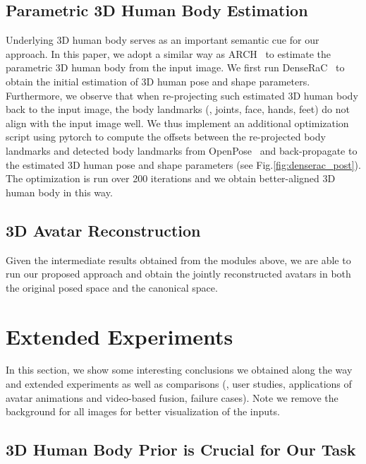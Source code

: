 \documentclass[10pt,twocolumn,letterpaper]{article}
\begin{document}
\subsection{Parametric 3D Human Body Estimation}



Underlying 3D human body serves as an important semantic cue for our approach. In this paper, we adopt a similar way as ARCH~\cite{huang2020arch} to estimate the parametric 3D human body from the input image. We first run DenseRaC~\cite{DenseRaCICCV19} to obtain the initial estimation of 3D human pose and shape parameters. Furthermore, we observe that when re-projecting such estimated 3D human body back to the input image, the body landmarks (\eg, joints, face, hands, feet) do not align with the input image well. We thus implement an additional optimization script using pytorch to compute the offsets between the re-projected body landmarks and detected body landmarks from OpenPose~\cite{openpose} and back-propagate to the estimated 3D human pose and shape parameters (see Fig.\ref{fig:denserac_post}). The optimization is run over 200 iterations and we obtain better-aligned 3D human body in this way.



\subsection{3D Avatar Reconstruction}

Given the intermediate results obtained from the modules above, we are able to run our proposed approach and obtain the jointly reconstructed avatars in both the original posed space and the canonical space.

\section{Extended Experiments}
In this section, we show some interesting conclusions we obtained along the way and extended experiments as well as comparisons (\eg, user studies, applications of avatar animations and video-based fusion, failure cases). Note we remove the background for all images for better visualization of the inputs.



\subsection{3D Human Body Prior is Crucial for Our Task}
\end{document}
